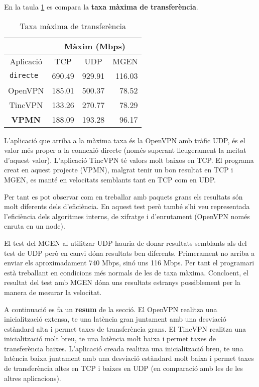 En la taula \ref{T:tax} es compara la \textbf{taxa màxima de transferència}.
\begin{table}[htb]
\begin{center}
\begin{tabular}{|c|c|c|r|}
\multicolumn{1}{c}{} & \multicolumn{3}{|c|}{Màxim (Mbps)} \\ \hline
Aplicació & TCP & UDP & MGEN \\ \hline \hline
\tt directe & 690.49 & 929.91 & 116.03 \\ \hline
OpenVPN & 185.01 & 500.37 & 78.52 \\ \hline
TincVPN & 133.26 & 270.77 & 78.29 \\ \hline
\bf VPMN & 188.09 & 193.28 & 96.17 \\ \hline
\end{tabular}
\end{center}
\begin{center}
\caption{Taxa màxima de transferència}
\label{T:tax}
\end{center}
\end{table}
L'aplicació que arriba a la màxima taxa és la OpenVPN amb tràfic UDP, és el valor més proper a la connexió directe (només superant lleugerament la meitat d'aquest valor).
L'aplicació TincVPN té valors molt baixos en TCP.
El programa creat en aquest projecte (VPMN), malgrat tenir un bon resultat en TCP i MGEN, es manté en velocitats semblants tant en TCP com en UDP.

Per tant es pot observar com en treballar amb paquets grans els resultats són molt diferents dels d'eficiència. En aquest test però també s'hi veu representada l'eficiència dels algoritmes interns, de xifratge i d'enrutament (OpenVPN només enruta en un node).

El test del MGEN al utilitzar UDP hauria de donar resultats semblants als del test de UDP però en canvi dóna resultats ben diferents. Primerament no arriba a enviar els aproximadament 740 Mbps, sinó uns 116 Mbps. Per tant el programari està treballant en condicions més normals de les de taxa màxima. Concloent, el resultat del test amb MGEN dóna uns resultats estranys possiblement per la manera de mesurar la velocitat.

A continuació es fa un \textbf{resum} de la secció.
El OpenVPN realitza una inicialització extensa, te una latència gran juntament amb una desviació estàndard alta i permet taxes de transferència grans.
El TincVPN realitza una inicialització molt breu, te una latència molt baixa i permet taxes de transferència baixes.
L'aplicació creada realitza una inicialització breu, te una latència baixa juntament amb una desviació estàndard molt baixa i permet taxes de transferència altes en TCP i baixes en UDP (en comparació amb les de les altres aplicacions).
